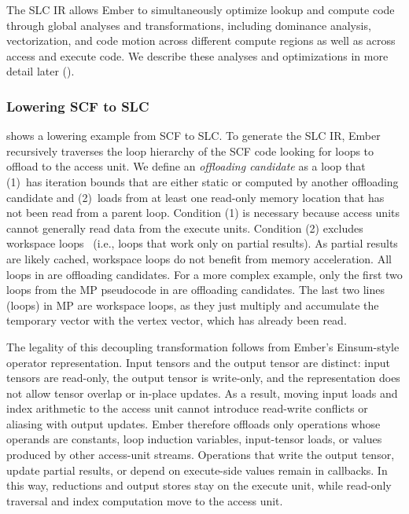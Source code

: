 The SLC IR allows Ember to simultaneously optimize lookup and compute code through global analyses and transformations, including dominance analysis, vectorization, and code motion across different compute regions as well as across access and execute code. We describe these analyses and optimizations in more detail later ().

\subsubsection{Lowering SCF to SLC} \label{sec:lowering-scf-to-slc} %

 shows a lowering example from SCF to SLC. To generate the SLC IR, Ember recursively traverses the loop hierarchy of the SCF code looking for loops to offload to the access unit. We define an \emph{offloading candidate} as a loop that (1)~has iteration bounds that are either static or computed by another offloading candidate and (2)~loads from at least one read-only memory location that has not been read from a parent loop. Condition (1) is necessary because access units cannot generally read data from the execute units. Condition (2) excludes workspace loops~\cite{kjolstad2019cgo,zhang2024pldi} (i.e., loops that work only on partial results). As partial results are likely cached, workspace loops do not benefit from memory acceleration. All loops in  are offloading candidates. For a more complex example, only the first two loops from the MP pseudocode in  are offloading candidates. The last two lines (loops) in MP are workspace loops, as they just multiply and accumulate the temporary vector with the vertex vector, which has already been read.

The legality of this decoupling transformation follows from Ember's Einsum-style operator representation. Input tensors and the output tensor are distinct: input tensors are read-only, the output tensor is write-only, and the representation does not allow tensor overlap or in-place updates. As a result, moving input loads and index arithmetic to the access unit cannot introduce read-write conflicts or aliasing with output updates. Ember therefore offloads only operations whose operands are constants, loop induction variables, input-tensor loads, or values produced by other access-unit streams. Operations that write the output tensor, update partial results, or depend on execute-side values remain in callbacks. In this way, reductions and output stores stay on the execute unit, while read-only traversal and index computation move to the access unit.

